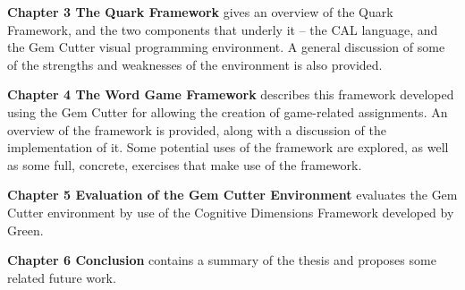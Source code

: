 \textbf{Chapter 3 The Quark Framework} gives an overview of the Quark Framework, and the two components that underly it -- the CAL language, and the Gem Cutter visual programming environment.  A general discussion of some of the strengths and weaknesses of the environment is also provided.

	
\textbf{Chapter 4 The Word Game Framework} describes this framework developed using the Gem Cutter for allowing the creation of game-related assignments.  An overview of the framework is provided, along with a discussion of the implementation of it.  Some potential uses of the framework are explored, as well as some full, concrete, exercises that make use of the framework.


\textbf{Chapter 5 Evaluation of the Gem Cutter Environment} evaluates the Gem Cutter environment by use of the Cognitive Dimensions Framework developed by Green.


\textbf{Chapter 6 Conclusion} contains a summary of the thesis and proposes some related future work.

\begin{comment}
\section{Challenges Presented}

What criteria needs to be met for the thesis to have met its goal?  Ie - the learning environment must have the following characteristics:

\begin{itemize}
	\item Easy to learn and use
	\item Allows new programmers to grasp fundamental programming concepts
	\item etc etc etc
\end{itemize}

\section{Approach}

\begin{itemize}
	\item Evaluation of GC via CG framework
	\item Development of Word game framework and exercises
\end{itemize}

\end{comment}

